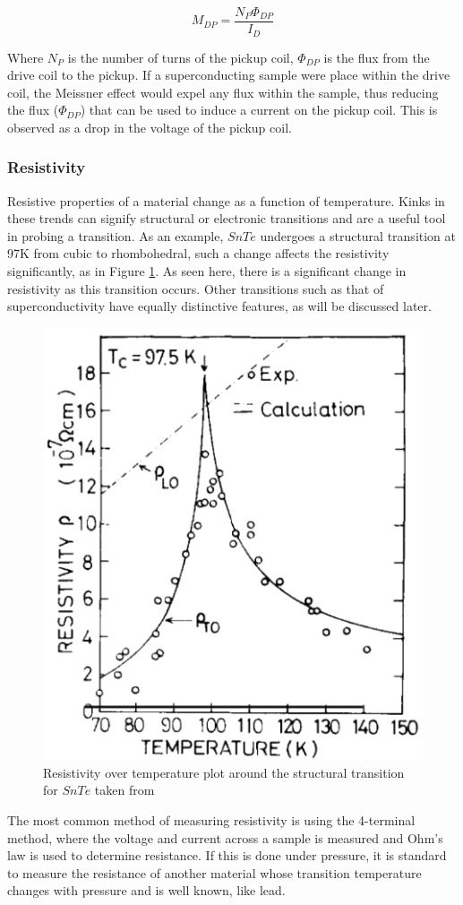 \documentclass[11pt,onecolumn]{article}
\begin{document}
\begin{equation}
M_{DP}=\frac{N_P\Phi_{DP}}{I_D}
\end{equation}

Where $N_P$ is the number of turns of the pickup coil, $\Phi_{DP}$ is the flux from the drive coil to the pickup. If a superconducting sample were place within the drive coil, the Meissner effect would expel any flux within the sample, thus reducing the flux ($\Phi_{DP}$) that can be used to induce a current on the pickup coil. This is observed as a drop in the voltage of the pickup coil.

\subsubsection{Resistivity}

Resistive properties of a material change as a function of temperature. Kinks in these trends can signify structural or electronic transitions and are a useful tool in probing a transition. As an example, $SnTe$ undergoes a structural transition at 97K from cubic to rhombohedral, such a change affects the resistivity significantly, as in Figure \ref{fig:5}. As seen here, there is a significant change in resistivity as this transition occurs. Other transitions such as that of superconductivity have equally distinctive features, as will be discussed later.\\

\begin{figure}[ht]
	\centering
	\includegraphics[width=.425\columnwidth]{figures/resistivity.png}
	\caption{Resistivity over temperature plot around the structural transition for $SnTe$ taken from \cite{resistivity}}
	\label{fig:5}
\end{figure}

The most common method of measuring resistivity is using the 4-terminal method, where the voltage and current across a sample is measured and Ohm's law is used to determine resistance. If this is done under pressure, it is standard to measure the resistance of another material whose transition temperature changes with pressure and is well known, like lead.
\end{document}
